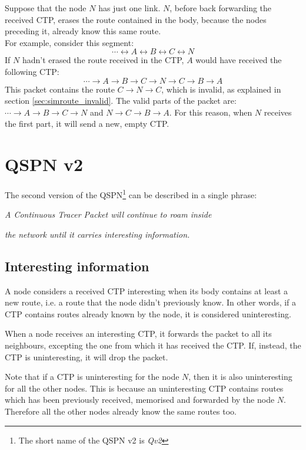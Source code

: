 \documentclass[a4paper]{article}
\begin{document}
Suppose that the node $N$ has just one link.
$N$, before back forwarding the received CTP, erases the route contained in
the body, because the nodes preceding it, already know this same route.
\\
For example, consider this segment:
\[ \cdots \leftrightarrow A \leftrightarrow B \leftrightarrow C \leftrightarrow N \]
If $N$ hadn't erased the route received in the CTP, $A$ would have received
the following CTP:
\[
\cdots \rightarrow A \rightarrow B \rightarrow C \rightarrow N \rightarrow C \rightarrow B \rightarrow A
\]
This packet contains the route $C \rightarrow N \rightarrow C$, which is
invalid, as explained in section \ref{sec:simroute_invalid}.
The valid parts of the packet are: $\cdots \rightarrow A \rightarrow B
\rightarrow C \rightarrow N$ and $N \rightarrow C \rightarrow B \rightarrow
A$. For this reason, when $N$ receives the first part, it will send a new,
empty CTP.

\section{QSPN v2}
\label{sec:QSPNv2}
The second version of the QSPN\footnote{The short name of the QSPN v2 is
\emph{Qv2}} can be described in a single phrase:

\emph{A Continuous Tracer Packet will continue to roam inside}

\emph{the network until it carries interesting information.}

\subsection{Interesting information}
\label{sec:interesting_info}

A node considers a received CTP interesting when its body contains at least a
new route, i.e. a route that the node didn't previously know.
In other words, if a CTP contains routes already known by the node, it is
considered uninteresting.

When a node receives an interesting CTP, it forwards the packet to all its
neighbours, excepting the one from which it has received the CTP.
If, instead, the CTP is uninteresting, it will drop the packet.

Note that if a CTP is uninteresting for the node $N$, then it is also
uninteresting for all the other nodes. This is because an uninteresting CTP
contains routes which has been previously received, memorised and forwarded
by the node $N$. Therefore all the other nodes already know the same
routes too.
\end{document}
